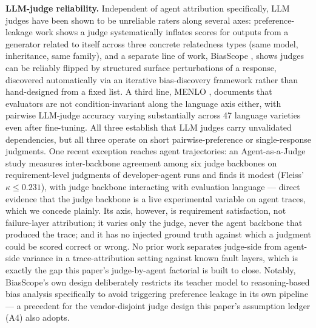 \documentclass[11pt]{article}
\begin{document}
\textbf{LLM-judge reliability.} Independent of agent attribution specifically, LLM judges have been shown to be unreliable raters along several axes: preference-leakage work \citep{PreferenceLeakage2025} shows a judge systematically inflates scores for outputs from a generator related to itself across three concrete relatedness types (same model, inheritance, same family), and a separate line of work, BiasScope \citep{BiasScope2025}, shows judges can be reliably flipped by structured surface perturbations of a response, discovered automatically via an iterative bias-discovery framework rather than hand-designed from a fixed list. A third line, MENLO \citep{MENLO2025}, documents that evaluators are not condition-invariant along the language axis either, with pairwise LLM-judge accuracy varying substantially across 47 language varieties even after fine-tuning. All three establish that LLM judges carry unvalidated dependencies, but all three operate on short pairwise-preference or single-response judgments. One recent exception reaches agent trajectories: an Agent-as-a-Judge study \citep{AaaJBackbone2026} measures inter-backbone agreement among six judge backbones on requirement-level judgments of developer-agent runs and finds it modest (Fleiss' $\kappa \leq 0.231$), with judge backbone interacting with evaluation language --- direct evidence that the judge backbone is a live experimental variable on agent traces, which we concede plainly. Its axis, however, is requirement satisfaction, not failure-layer attribution; it varies only the judge, never the agent backbone that produced the trace; and it has no injected ground truth against which a judgment could be scored correct or wrong. No prior work separates judge-side from agent-side variance in a trace-attribution setting against known fault layers, which is exactly the gap this paper's judge-by-agent factorial is built to close. Notably, BiasScope's own design deliberately restricts its teacher model to reasoning-based bias analysis specifically to avoid triggering preference leakage \citep{PreferenceLeakage2025} in its own pipeline --- a precedent for the vendor-disjoint judge design this paper's assumption ledger (A4) also adopts.
\end{document}
